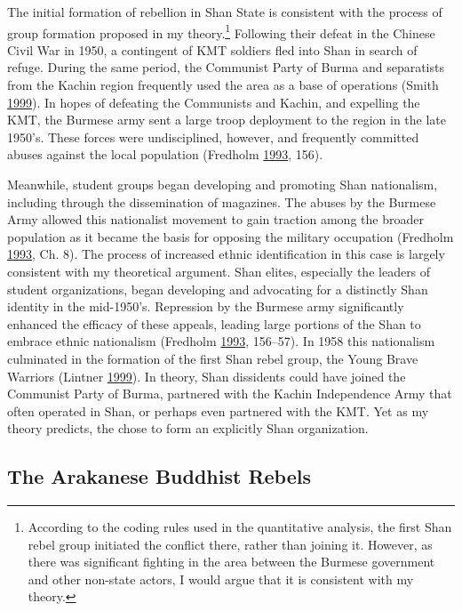 \documentclass[12pt,]{book}
\let\rmarkdownfootnote\footnote%
\def\footnote{\protect\rmarkdownfootnote}
\theoremstyle{definition}
\theoremstyle{definition}
\theoremstyle{definition}
\theoremstyle{remark}
\begin{document}
The initial formation of rebellion in Shan State is consistent with the
process of group formation proposed in my theory.\footnote{According to
  the coding rules used in the quantitative analysis, the first Shan
  rebel group initiated the conflict there, rather than joining it.
  However, as there was significant fighting in the area between the
  Burmese government and other non-state actors, I would argue that it
  is consistent with my theory.} Following their defeat in the Chinese
Civil War in 1950, a contingent of KMT soldiers fled into Shan in search
of refuge. During the same period, the Communist Party of Burma and
separatists from the Kachin region frequently used the area as a base of
operations (Smith \protect\hyperlink{ref-Smith1999}{1999}). In hopes of
defeating the Communists and Kachin, and expelling the KMT, the Burmese
army sent a large troop deployment to the region in the late 1950's.
These forces were undisciplined, however, and frequently committed
abuses against the local population (Fredholm
\protect\hyperlink{ref-Fredholm1993}{1993}, 156).

Meanwhile, student groups began developing and promoting Shan
nationalism, including through the dissemination of magazines. The
abuses by the Burmese Army allowed this nationalist movement to gain
traction among the broader population as it became the basis for
opposing the military occupation (Fredholm
\protect\hyperlink{ref-Fredholm1993}{1993}, Ch. 8). The process of
increased ethnic identification in this case is largely consistent with
my theoretical argument. Shan elites, especially the leaders of student
organizations, began developing and advocating for a distinctly Shan
identity in the mid-1950's. Repression by the Burmese army significantly
enhanced the efficacy of these appeals, leading large portions of the
Shan to embrace ethnic nationalism (Fredholm
\protect\hyperlink{ref-Fredholm1993}{1993}, 156--57). In 1958 this
nationalism culminated in the formation of the first Shan rebel group,
the Young Brave Warriors (Lintner
\protect\hyperlink{ref-Lintner1999}{1999}). In theory, Shan dissidents
could have joined the Communist Party of Burma, partnered with the
Kachin Independence Army that often operated in Shan, or perhaps even
partnered with the KMT. Yet as my theory predicts, the chose to form an
explicitly Shan organization.

\hypertarget{the-arakanese-buddhist-rebels}{%
\subsection{The Arakanese Buddhist
Rebels}\label{the-arakanese-buddhist-rebels}}
\end{document}
